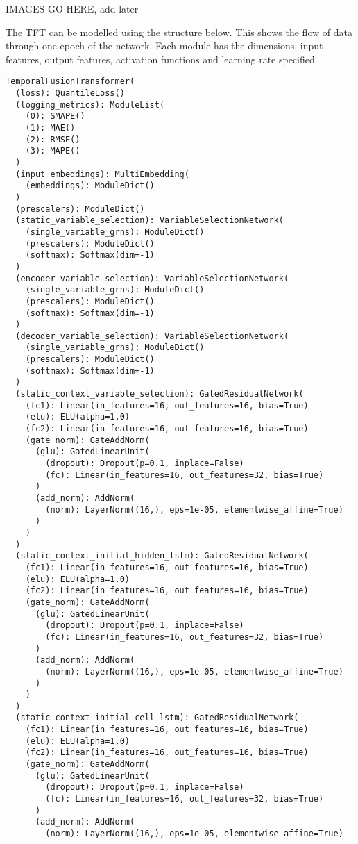 \documentclass{article}
\begin{document}
IMAGES GO HERE, add later


The TFT can be modelled using the structure below. This shows the flow of data through one epoch of the network.  Each module has the dimensions, input features, output features, activation functions and learning rate specified.

\begin{lstlisting}
TemporalFusionTransformer(
  (loss): QuantileLoss()
  (logging_metrics): ModuleList(
    (0): SMAPE()
    (1): MAE()
    (2): RMSE()
    (3): MAPE()
  )
  (input_embeddings): MultiEmbedding(
    (embeddings): ModuleDict()
  )
  (prescalers): ModuleDict()
  (static_variable_selection): VariableSelectionNetwork(
    (single_variable_grns): ModuleDict()
    (prescalers): ModuleDict()
    (softmax): Softmax(dim=-1)
  )
  (encoder_variable_selection): VariableSelectionNetwork(
    (single_variable_grns): ModuleDict()
    (prescalers): ModuleDict()
    (softmax): Softmax(dim=-1)
  )
  (decoder_variable_selection): VariableSelectionNetwork(
    (single_variable_grns): ModuleDict()
    (prescalers): ModuleDict()
    (softmax): Softmax(dim=-1)
  )
  (static_context_variable_selection): GatedResidualNetwork(
    (fc1): Linear(in_features=16, out_features=16, bias=True)
    (elu): ELU(alpha=1.0)
    (fc2): Linear(in_features=16, out_features=16, bias=True)
    (gate_norm): GateAddNorm(
      (glu): GatedLinearUnit(
        (dropout): Dropout(p=0.1, inplace=False)
        (fc): Linear(in_features=16, out_features=32, bias=True)
      )
      (add_norm): AddNorm(
        (norm): LayerNorm((16,), eps=1e-05, elementwise_affine=True)
      )
    )
  )
  (static_context_initial_hidden_lstm): GatedResidualNetwork(
    (fc1): Linear(in_features=16, out_features=16, bias=True)
    (elu): ELU(alpha=1.0)
    (fc2): Linear(in_features=16, out_features=16, bias=True)
    (gate_norm): GateAddNorm(
      (glu): GatedLinearUnit(
        (dropout): Dropout(p=0.1, inplace=False)
        (fc): Linear(in_features=16, out_features=32, bias=True)
      )
      (add_norm): AddNorm(
        (norm): LayerNorm((16,), eps=1e-05, elementwise_affine=True)
      )
    )
  )
  (static_context_initial_cell_lstm): GatedResidualNetwork(
    (fc1): Linear(in_features=16, out_features=16, bias=True)
    (elu): ELU(alpha=1.0)
    (fc2): Linear(in_features=16, out_features=16, bias=True)
    (gate_norm): GateAddNorm(
      (glu): GatedLinearUnit(
        (dropout): Dropout(p=0.1, inplace=False)
        (fc): Linear(in_features=16, out_features=32, bias=True)
      )
      (add_norm): AddNorm(
        (norm): LayerNorm((16,), eps=1e-05, elementwise_affine=True)

\end{lstlisting}
\end{document}
